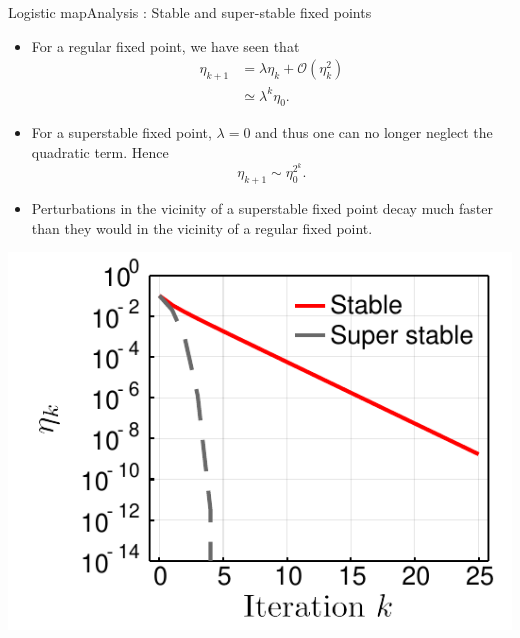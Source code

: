 \documentclass[usenames,dvipsnames,svgnames,10pt,aspectratio=169]{beamer}
\begin{document}
\begin{frame}[t, c]{Logistic map}{Analysis : Stable and super-stable fixed points}
	\begin{minipage}{.68\textwidth}
		\begin{itemize}
			\item For a regular fixed point, we have seen that
			\[
				\begin{aligned}
					\eta_{k+1} & = \lambda \eta_k + \mathcal{O}(\eta_k^2) \\
					& \simeq \lambda^k \eta_0.
				\end{aligned}
			\]

			\item For a superstable fixed point, \( \lambda = 0 \) and thus one can no longer neglect the quadratic term.
			Hence
			\[
				\eta_{k+1} \sim \eta_0^{2^k}.
			\]

			\item Perturbations in the vicinity of a superstable fixed point decay much faster than they would in the vicinity of a regular fixed point.
		\end{itemize}
	\end{minipage}%
	\hfill
	\begin{minipage}{.28\textwidth}
		\centering
		\includegraphics[width=\textwidth]{stable_vs_superstable}
	\end{minipage}

	\vspace{1cm}
\end{frame}
\end{document}
